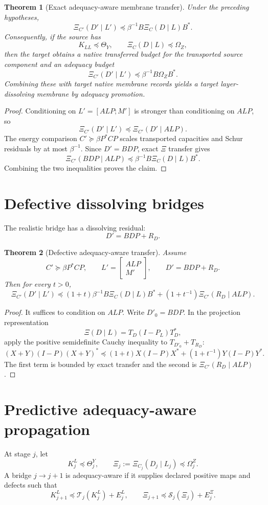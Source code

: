\documentclass[11pt]{article}
\newtheorem{theorem}{Theorem}
\newcommand{\pre}{\preceq}
\begin{document}
\begin{theorem}[Exact adequacy-aware membrane transfer]
Under the preceding hypotheses,
\[
\boxed{
\Xi_{C'}(D'\mid L')\pre \beta^{-1}B\Xi_C(D\mid L)B^*.
}
\]
Consequently, if the source has
\[
K_{LL}\pre\Theta_Y,
\qquad
\Xi_C(D\mid L)\pre\Omega_Z,
\]
then the target obtains a native transferred budget for the transported source component and an adequacy budget
\[
\Xi_{C'}(D'\mid L')\pre \beta^{-1}B\Omega_ZB^*.
\]
Combining these with target native membrane records yields a target layer-dissolving membrane by adequacy promotion.
\end{theorem}

\begin{proof}
Conditioning on $L'=[ALP;M']$ is stronger than conditioning on $ALP$, so
\[
\Xi_{C'}(D'\mid L')\pre \Xi_{C'}(D'\mid ALP).
\]
The energy comparison $C'\succeq\beta P^*CP$ scales transported capacities and Schur residuals by at most $\beta^{-1}$.  Since $D'=BDP$, exact $\Xi$ transfer gives
\[
\Xi_{C'}(BDP\mid ALP)\pre \beta^{-1}B\Xi_C(D\mid L)B^*.
\]
Combining the two inequalities proves the claim.
\end{proof}

\section{Defective dissolving bridges}
The realistic bridge has a dissolving residual:
\[
D'=BDP+R_D.
\]

\begin{theorem}[Defective adequacy-aware transfer]
Assume
\[
C'\succeq\beta P^*CP,
\qquad
L'=\begin{bmatrix}ALP\\M'\end{bmatrix},
\qquad
D'=BDP+R_D.
\]
Then for every $t>0$,
\[
\boxed{
\Xi_{C'}(D'\mid L')
\pre
(1+t)\beta^{-1}B\Xi_C(D\mid L)B^*
+(1+t^{-1})\Xi_{C'}(R_D\mid ALP).
}
\]
\end{theorem}

\begin{proof}
It suffices to condition on $ALP$.  Write $D'_0=BDP$.  In the projection representation
\[
\Xi(D\mid L)=T_D(I-P_L)T_D^*,
\]
apply the positive semidefinite Cauchy inequality to $T_{D'_0}+T_{R_D}$:
\[
(X+Y)(I-P)(X+Y)^*\pre (1+t)X(I-P)X^*+(1+t^{-1})Y(I-P)Y^*.
\]
The first term is bounded by exact transfer and the second is $\Xi_{C'}(R_D\mid ALP)$.
\end{proof}

\section{Predictive adequacy-aware propagation}
At stage $j$, let
\[
K^L_j\pre\Theta^Y_j,
\qquad
\Xi_j:=\Xi_{C_j}(D_j\mid L_j)\pre\Omega^Z_j.
\]
A bridge $j\to j+1$ is adequacy-aware if it supplies declared positive maps and defects such that
\[
K^L_{j+1}\pre \mathcal T_j(K^L_j)+E^L_j,
\qquad
\Xi_{j+1}\pre \mathcal S_j(\Xi_j)+E^\Xi_j.
\]
\end{document}
